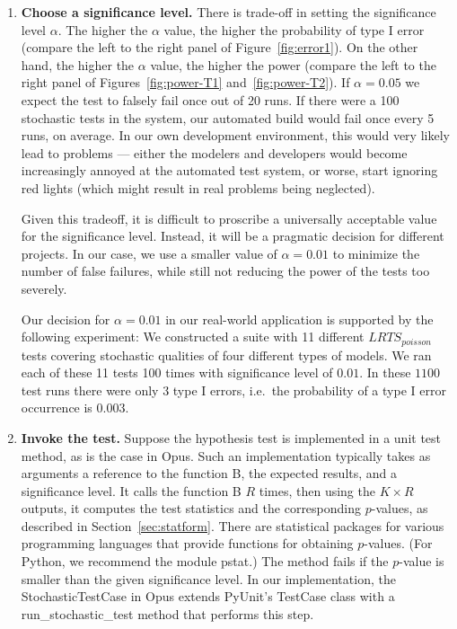 \begin{enumerate}
\item
\label{choose-significance-level}
{\bf Choose a significance level.}  There is trade-off in setting the
significance level $\alpha$. The higher the $\alpha$ value, the higher the
probability of type I error (compare the left to the right panel of
Figure~\ref{fig:error1}). On the other hand, the higher the $\alpha$ value,
the higher the power (compare the left to the right panel of
Figures~\ref{fig:power-T1} and~\ref{fig:power-T2}). If $\alpha=0.05$ we
expect the test to falsely fail once out of 20 runs.  If there were a 100
stochastic tests in the system, our automated build would fail once every 5
runs, on average.  In our own development environment, this would very
likely lead to problems --- either the modelers and developers would become
increasingly annoyed at the automated test system, or worse, start ignoring
red lights (which might result in real problems being neglected).
  
Given this tradeoff, it is difficult to proscribe a universally acceptable
value for the significance level.  Instead, it will be a pragmatic decision
for different projects.  In our case, we use a smaller value of
$\alpha=0.01$ to minimize the number of false failures, while still not 
reducing the power of the tests too severely.

Our decision for $\alpha=0.01$ in our real-world application is supported by
the following experiment: We constructed a suite with 11 different
$LRTS_{poisson}$ tests covering stochastic qualities of four different types
of models.  We ran each of these 11 tests 100 times with significance level of
$0.01$.  In these $1100$ test runs there were only 3 type I errors, i.e.\ the
probability of a type I error occurrence is $0.003$.

\item
{\bf Invoke the test.}  Suppose the hypothesis test is implemented in a
unit test method, as is the case in Opus. Such an implementation typically
takes as arguments a reference to the function B, the expected results, and
a significance level.  It calls the function B $R$ times, then using the
$K\times R$ outputs, it computes the test statistics and the corresponding
$p$-values, as described in Section~\ref{sec:statform}. There are
statistical packages for various programming languages that provide
functions for obtaining $p$-values.  (For Python, we recommend the module
pstat.) The method fails if the $p$-value is smaller than the given
significance level.  In our implementation, the StochasticTestCase in Opus
extends PyUnit's TestCase class with a run\_stochastic\_test method that
performs this step.


\end{enumerate}

